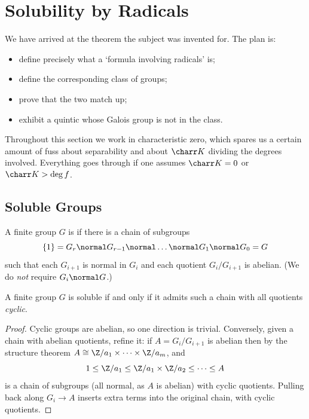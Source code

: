 \section{Solubility by Radicals}\label{sec:soluble}

We have arrived at the theorem the subject was invented for. The plan is:
\begin{itemize}
	\item define precisely what a `formula involving radicals' is;
	\item define the corresponding class of groups;
	\item prove that the two match up;
	\item exhibit a quintic whose Galois group is not in the class.
\end{itemize}

Throughout this section we work in characteristic zero, which spares us a certain amount of fuss about separability and about $\charr K$ dividing the degrees involved. Everything goes through if one assumes $\charr K = 0$ or $\charr K > \deg f$.

\subsection{Soluble Groups}

\begin{definition}
	A finite group $G$ is  if there is a chain of subgroups
	$$\{1\} = G_r \normal G_{r-1}\normal \dots \normal G_1 \normal G_0 = G$$
	such that each $G_{i+1}$ is normal in $G_i$ and each quotient $G_i/G_{i+1}$ is abelian. (We do \emph{not} require $G_i \normal G$.)
\end{definition}

\begin{lemma}\label{lem:solcyclic}
	A finite group $G$ is soluble if and only if it admits such a chain with all quotients \emph{cyclic}.
\end{lemma}

\begin{proof}
	Cyclic groups are abelian, so one direction is trivial. Conversely, given a chain with abelian quotients, refine it: if $A = G_i/G_{i+1}$ is abelian then by the structure theorem $A \cong \Z/a_1\times\dots\times\Z/a_m$, and
	$$1 \leq \Z/a_1 \leq \Z/a_1\times\Z/a_2\leq \dots \leq A$$
	is a chain of subgroups (all normal, as $A$ is abelian) with cyclic quotients. Pulling back along $G_i \to A$ inserts extra terms into the original chain, with cyclic quotients.
\end{proof}

